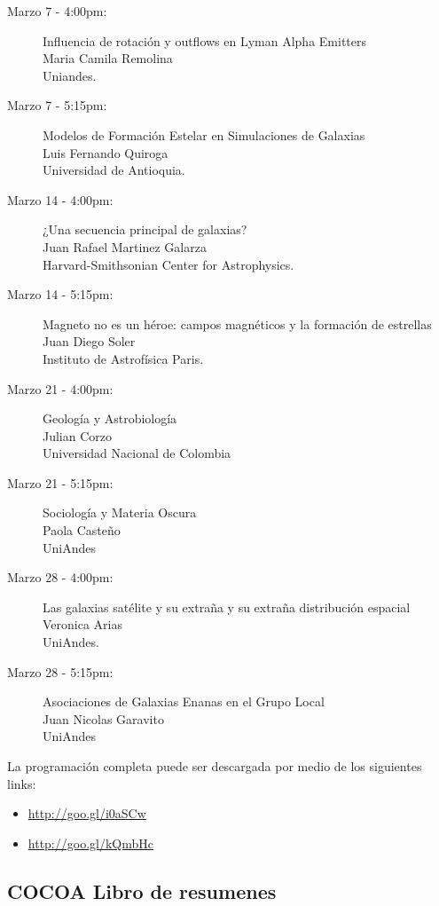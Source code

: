 \documentclass{book}
\begin{document}
\begin{description}
\item[Marzo 7 - 4:00pm:] Influencia de rotación y outflows en Lyman Alpha Emitters\\
Maria Camila Remolina\\
Uniandes.
\item[Marzo 7 - 5:15pm:] Modelos de Formación Estelar en Simulaciones de Galaxias\\
Luis Fernando Quiroga\\
Universidad de Antioquia.
\item[Marzo 14 - 4:00pm:] ¿Una secuencia principal de galaxias?\\ 
Juan Rafael Martinez Galarza\\ 
Harvard-Smithsonian Center for Astrophysics. 
\item[Marzo 14 - 5:15pm:] Magneto no es un héroe: campos magnéticos y la formación de estrellas\\ 
Juan Diego Soler\\
Instituto de Astrofísica Paris.   
\item[Marzo 21 - 4:00pm:] Geología y Astrobiología\\ 
Julian Corzo\\  
Universidad Nacional de Colombia
\item[Marzo 21 - 5:15pm:] Sociología y Materia Oscura\\
Paola Casteño\\ 
UniAndes  
\item[Marzo 28 - 4:00pm:] Las galaxias satélite y su extraña y su extraña distribución espacial\\
Veronica Arias\\
UniAndes.
\item[Marzo 28 - 5:15pm:] Asociaciones de Galaxias Enanas en el Grupo Local\\
Juan Nicolas Garavito\\
UniAndes 
\end{description}

\noindent La programación completa puede ser descargada por medio de los siguientes links:

\begin{itemize}
\item \url{http://goo.gl/i0aSCw}
\item \url{http://goo.gl/kQmbHc}
\end{itemize}

\subsection{COCOA Libro de resumenes}
\end{document}
